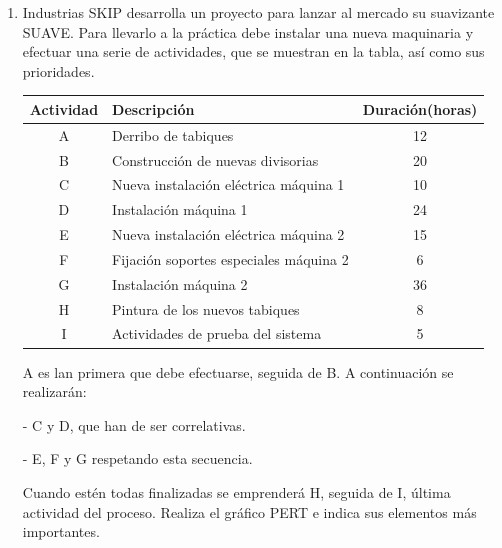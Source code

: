 \documentclass[../main]{subfiles}
\begin{document}
\begin{enumerate}
    \item Industrias SKIP desarrolla un proyecto para lanzar al mercado su suavizante SUAVE. Para llevarlo a la
práctica debe instalar una nueva maquinaria y efectuar una serie de actividades, que se muestran en la tabla, así como sus
prioridades. 
\begin{table}[h!]
    \centering
    \begin{tabular}{|c|l|c|} \hline  
Actividad & Descripción &Duración(horas) \\ \hline \hline
A & Derribo de tabiques &12\\
B &Construcción de nuevas divisorias &20\\
C &Nueva instalación eléctrica máquina 1& 10\\
D &Instalación máquina 1 & 24\\
E &Nueva instalación eléctrica máquina 2& 15\\
F &Fijación soportes especiales máquina 2& 6\\
G &Instalación máquina 2& 36\\
H &Pintura de los nuevos tabiques& 8\\
I &Actividades de prueba del sistema& 5\\ \hline
 \end{tabular}
\end{table}

A es lan primera que debe efectuarse, seguida de B.
A continuación se realizarán:

- C y D, que han de ser correlativas.

- E, F y G respetando esta secuencia.

Cuando estén todas finalizadas se emprenderá H, seguida de I, última actividad del proceso.
Realiza el gráfico PERT e indica sus elementos más importantes. 

\end{enumerate}
\end{document}
